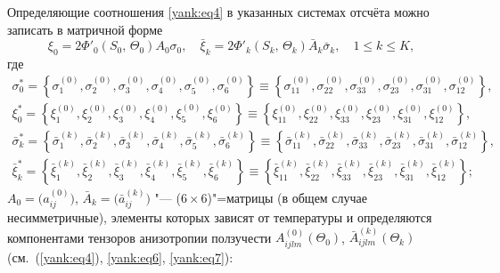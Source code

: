 Определяющие соотношения \eqref{yank:eq4} в указанных системах отсчёта можно записать в
матричной форме
\begin{equation}
\label{yank:eq6}
\xi _0 =2 \Phi'_0 (S_0,\,\Theta _0)A_0 \sigma _0,\quad \bar {\xi}_k =2 \Phi'_k (S_k,\,\Theta _k) \bar {A}_k  \bar{\sigma}_k,\quad 1\le k\le K,
\end{equation}
где
\begin{equation}
\label{yank:eq7}
\begin{array}{l}
\sigma_0^\ast =\left\{ \sigma _1^{(0)},\sigma _2^{(0)},\sigma
_3^{(0)},\sigma_4^{(0)},\sigma _5^{(0)},\sigma _6^{(0)}\right\}\equiv \left\{ \sigma _{11}^{(0)},\sigma _{22}^{(0)},\sigma _{33}^{(0)},\sigma _{23}^{(0)},\sigma _{31}^{(0)},
\sigma _{12}^{(0)}\right\}, \\
\xi_0^\ast =\left\{ \xi_1^{(0)},\xi _2^{(0)},\xi_3^{(0)},\xi _4^{(0)},\xi _5^{(0)},\xi _6^{(0)}\right\}\equiv
\left\{ \xi _{11}^{(0)},\xi _{22}^{(0)},\xi _{33}^{(0)},\xi_{23}^{(0)},\xi _{31}^{(0)},\xi _{12}^{(0)} \right\}, \\
\bar {\sigma }_k^\ast =\left\{\bar {\sigma }_1^{(k)},\bar {\sigma}_2^{(k)},\bar {\sigma }_3^{(k)},\bar {\sigma}_4^{(k)},\bar
{\sigma }_5^{(k)},\bar {\sigma }_6^{(k)} \right\}\equiv \left\{ \bar {\sigma }_{11}^{(k)},\bar {\sigma }_{22}^{(k)},\bar {\sigma
}_{33}^{(k)},\bar {\sigma }_{23}^{(k)},\bar {\sigma }_{31}^{(k)},\bar {\sigma }_{12}^{(k)} \right\}, \\
\bar {\xi }_k^\ast =\left\{\bar {\xi }_1^{(k)},\bar {\xi }_2^{(k)},\bar {\xi}_3^{(k)},\bar {\xi }_4^{(k)},\bar {\xi }_5^{(k)},
\bar {\xi }_6^{(k)} \right\}\equiv \left\{ \bar {\xi }_{11}^{(k)},\bar {\xi }_{22}^{(k)},\bar {\xi }_{33}^{(k)},\bar {\xi}_{23}^{(k)},\bar {\xi}_{31}^{(k)},
\bar {\xi }_{12}^{(k)}\right\};
\end{array}
\end{equation}
$A_0 =\bigl( a_{ij}^{(0) } \bigr)$, $\bar {A}_k =\bigl( \bar {a}_{ij}^{(k)} \bigr)$ "---
($6{\times}6$)"=матрицы (в общем случае несимметричные), элементы которых зависят
от температуры и определяются компонентами тензоров анизотропии ползучести
$A_{ijlm}^{(0)} (\Theta _0)$, $\bar {A}_{ijlm}^{(k)} (\Theta _k)$ (см.~(\ref{yank:eq4}), \eqref{yank:eq6}, \eqref{yank:eq7}):
